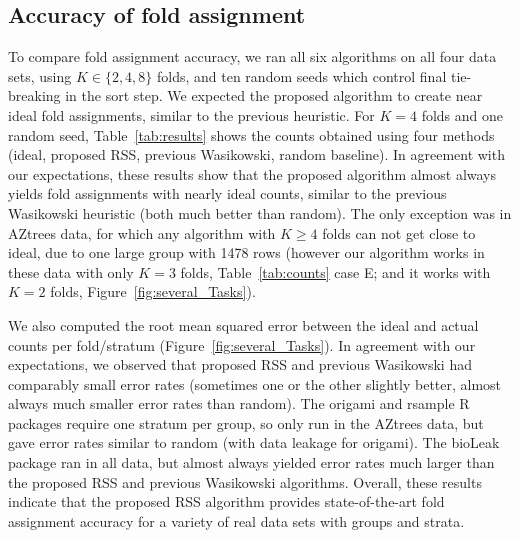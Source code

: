 \documentclass[twoside]{article}
\begin{document}

\subsection{Accuracy of fold assignment}

To compare fold assignment accuracy, we ran all six algorithms on all four data sets, using $K\in\{2,4,8\}$ folds, and ten random seeds which control final tie-breaking in the sort step.
We expected the proposed algorithm to create near ideal fold assignments, similar to the previous heuristic.
For $K=4$ folds and one random seed, Table~\ref{tab:results} shows the counts obtained using four methods (ideal, proposed RSS, previous Wasikowski, random baseline).
In agreement with our expectations, these results show that the proposed algorithm almost always yields fold assignments with nearly ideal counts, similar to the previous Wasikowski heuristic (both much better than random).
The only exception was in AZtrees data, for which any algorithm with $K\geq 4$ folds can not get close to ideal, due to one large group with 1478 rows (however our algorithm works in these data with only $K=3$ folds, Table~\ref{tab:counts} case E; and it works with $K=2$ folds, Figure~\ref{fig:several_Tasks}).

We also computed the root mean squared error between the ideal and actual counts per fold/stratum (Figure~\ref{fig:several_Tasks}).
In agreement with our expectations, we observed that proposed RSS and previous Wasikowski had comparably small error rates (sometimes one or the other slightly better, almost always much smaller error rates than random).
The origami and rsample R packages require one stratum per group, so only run in the AZtrees data, but gave error rates similar to random (with data leakage for origami).
The bioLeak package ran in all data, but almost always yielded error rates much larger than the proposed RSS and previous Wasikowski algorithms.
Overall, these results indicate that the proposed RSS algorithm provides state-of-the-art fold assignment accuracy for a variety of real data sets with groups and strata.
\end{document}
